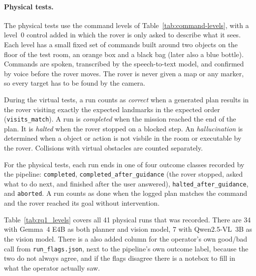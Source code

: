 \paragraph{Physical tests.} The physical tests use the command levels of Table~\ref{tab:command-levels}, 
with a level~0 control added in which the rover is only asked to describe what it sees. 
Each level has a small fixed set of commands built around two objects on the floor of the 
test room, an orange box and a black bag (later also a blue bottle). Commands are spoken, transcribed 
by the speech-to-text model, and confirmed by voice before the rover moves. The rover is never given a map or any marker, so every target has to be found by the camera.

\label{ssec:metrics}

During the virtual tests, a run counts as \emph{correct} when a generated plan results in the rover visiting
exactly the expected landmarks in the expected order (\texttt{visits\_match}). 
A run is \emph{completed} when the mission reached the end of the plan. It is \emph{halted} 
when the rover stopped on a blocked step. An \emph{hallucination} is determined when a object or 
action is not visbile in the room or executable by the rover. Collisions with virtual obstacles are counted separately.

For the physical tests, each run ends in one of four outcome classes recorded by the pipeline:
 \texttt{completed}, \texttt{completed\_after\_guidance} (the rover stopped, asked what to do next, 
 and finished after the user answered), \texttt{halted\_after\_guidance}, and \texttt{aborted}. 
 A run counts as done when the logged plan matches the command and the rover reached its goal without intervention. 

\label{sec:rq1_results}

Table~\ref{tab:rq1_levels} covers all 41 physical runs that was recorded. There are 34 with Gemma~4 E4B as both planner and vision model, 7 with Qwen2.5-VL~3B as the vision model.
There is a also added column for the operator's own good/bad call from \texttt{run\_flags.json}, next to the pipeline's own outcome label, because the
two do not always agree, and if the flags disagree there is a notebox to fill in what the operator actually saw.

